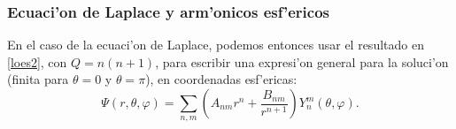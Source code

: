 \subsubsection{Ecuaci'on de Laplace y arm'onicos esf'ericos}
En el caso de la ecuaci'on de Laplace, podemos entonces usar el resultado en \eqref{loes2}, con $Q=n(n+1)$, para escribir una expresi'on general para la soluci'on (finita para $\theta=0$ y $\theta=\pi$), en coordenadas esf'ericas:
\begin{equation}
\Psi(r,\theta,\varphi)=\sum_{n,m}\left(A_{nm}r^n+\frac{B_{nm}}{r^{n+1}}\right)Y_n^m(\theta,\varphi).
\end{equation}